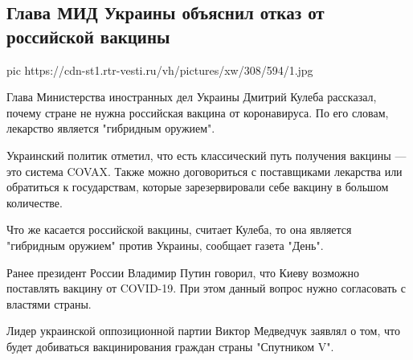  
 
 
 
 
 
\subsection{Глава МИД Украины объяснил отказ от российской вакцины}
\label{sec:29_12_2020.news.ru.vesti.2.mid_ukraina_vaccine_sputnik_v}


\ifcmt
  pic https://cdn-st1.rtr-vesti.ru/vh/pictures/xw/308/594/1.jpg
\fi

Глава Министерства иностранных дел Украины Дмитрий Кулеба рассказал, почему
стране не нужна российская вакцина от коронавируса. По его словам, лекарство
является "гибридным оружием".

Украинский политик отметил, что есть классический путь получения вакцины — это
система COVAX. Также можно договориться с поставщиками лекарства или обратиться
к государствам, которые зарезервировали себе вакцину в большом количестве.

Что же касается российской вакцины, считает Кулеба, то она является "гибридным
оружием" против Украины, сообщает газета "День".

Ранее президент России Владимир Путин говорил, что Киеву возможно поставлять
вакцину от COVID-19. При этом данный вопрос нужно согласовать с властями
страны.

Лидер украинской оппозиционной партии Виктор Медведчук заявлял о том, что будет
добиваться вакцинирования граждан страны "Спутником V".
